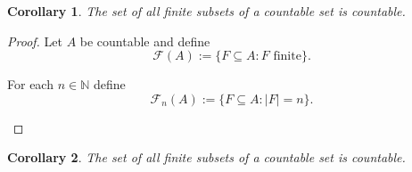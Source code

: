 \documentclass[10pt,a4paper]{book}
\newtheorem{corollary}{Corollary}[section]
\begin{document}
\begin{corollary}
    The set of all finite subsets of a countable set is countable.
\end{corollary}

\begin{proof}

    Let $A$ be countable and define
    \[
        \mathcal{F}(A):=\{F\subseteq A : F \text{ finite}\}.
    \]

    For each $n\in\mathbb N$ define
    \[
        \mathcal{F}_n(A):=\{F\subseteq A : |F|=n\}.
    \]

    \begin{fitchproof}[arrayenv=tabular]



        \open
        \close





    \end{fitchproof}

\end{proof}

\begin{corollary}
    The set of all finite subsets of a countable set is countable.
\end{corollary}
\end{document}
